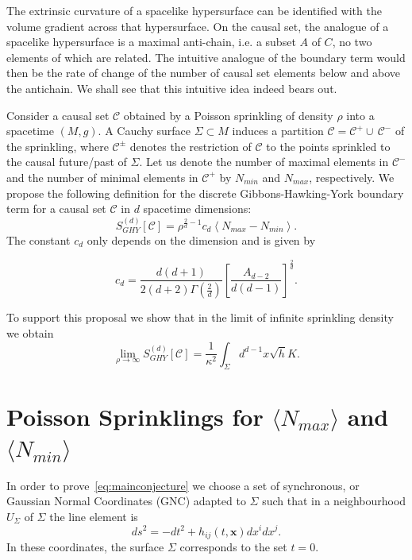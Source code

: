 \documentclass[12pt]{article}
\newcommand{\be}{\begin{equation}}
\newcommand{\ee}{\end{equation}}
\begin{document}
The extrinsic curvature of a spacelike hypersurface can be identified with the volume gradient across that hypersurface. On the causal set, the analogue of a spacelike hypersurface is a maximal anti-chain, i.e. a subset $A$ of $C$, no two elements of which are related. The intuitive analogue of the boundary term would then be the rate of change of the number of causal set elements below and above the antichain. We shall see that this intuitive idea indeed bears out.

Consider a causal set $\mathcal C$ obtained by a Poisson sprinkling of density $\rho$ into a spacetime $(M,g)$. A Cauchy surface $\Sigma\subset M$ induces a partition $\mathcal C = \mathcal C^+ \cup\, \mathcal C^-$ of the sprinkling, where $\mathcal C^\pm$ denotes the restriction of $\mathcal C$ to the points sprinkled to the causal future/past of $\Sigma$. Let us denote the number of maximal elements in $\mathcal C^-$ and the number of minimal elements in $\mathcal C^+$ by $N_{min}$ and $N_{max}$, respectively. We propose the following definition for the discrete Gibbons-Hawking-York boundary term for a causal set $\mathcal C$ in $d$ spacetime dimensions:
\be\label{GH_boundary_to_causet}
S^{(d)}_{GHY}[\mathcal C]=\rho^{\frac{2}{d}-1}c_{d}\left\langle N_{max}-N_{min}\right\rangle.
\ee
The constant $c_{d}$ only depends on the dimension and is given by

\be\label{Cn}
c_{d}=\frac{d(d+1)}{2(d+2)\Gamma\left(\frac{2}{d}\right)}\left[\frac{A_{d-2}}{d(d-1)}\right]^{\frac{2}{d}}.
\ee

To support this proposal we show that in the limit of infinite sprinkling density we obtain
\be
\lim_{\rho\rightarrow\infty}S^{(d)}_{GHY}[\mathcal C] = \frac1{\kappa^2} \int_{\Sigma} d^{d-1}x \sqrt{h} K.\label{eq:mainconjecture}
\ee

\section{Poisson Sprinklings for $\langle N_{max}\rangle$ and $\langle N_{min}\rangle$}

In order to prove~\eqref{eq:mainconjecture} we choose a set of synchronous, or Gaussian Normal Coordinates (GNC) adapted to $\Sigma$ such that in a neighbourhood $U_\Sigma$ of $\Sigma$ the line element is
\be
ds^2 = -dt^2 + h_{ij}(t,\mathbf x) dx^i dx^j.
\ee
In these coordinates, the surface $\Sigma$ corresponds to the set $t=0$. 
\end{document}
